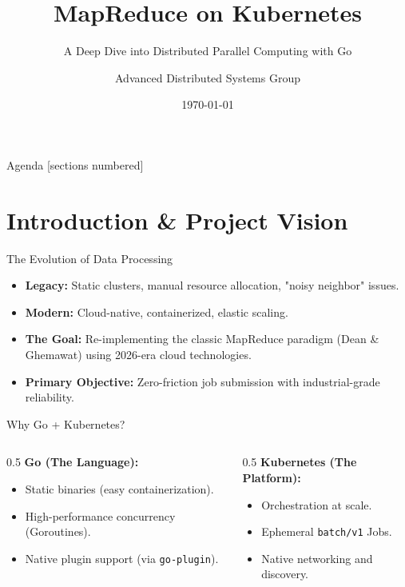 \documentclass[10pt,aspectratio=169]{beamer}
\title{MapReduce on Kubernetes}
\subtitle{A Deep Dive into Distributed Parallel Computing with Go}
\author{Advanced Distributed Systems Group}
\date{\today}
\begin{document}
\maketitle

\begin{frame}{Agenda}
    [sections numbered]
    \tableofcontents[hideallsubsections]
\end{frame}

\section{Introduction \& Project Vision}

\begin{frame}{The Evolution of Data Processing}
    \begin{itemize}
        \item \textbf{Legacy:} Static clusters, manual resource allocation, "noisy neighbor" issues.
        \item \textbf{Modern:} Cloud-native, containerized, elastic scaling.
        \item \textbf{The Goal:} Re-implementing the classic MapReduce paradigm (Dean \& Ghemawat) using 2026-era cloud technologies.
        \item \textbf{Primary Objective:} Zero-friction job submission with industrial-grade reliability.
    \end{itemize}
\end{frame}

\begin{frame}{Why Go + Kubernetes?}
    \begin{columns}
        \begin{column}{0.5\textwidth}
            \textbf{Go (The Language):}
            \begin{itemize}
                \item Static binaries (easy containerization).
                \item High-performance concurrency (Goroutines).
                \item Native plugin support (via \texttt{go-plugin}).
            \end{itemize}
        \end{column}
        \begin{column}{0.5\textwidth}
            \textbf{Kubernetes (The Platform):}
            \begin{itemize}
                \item Orchestration at scale.
                \item Ephemeral \texttt{batch/v1} Jobs.
                \item Native networking and discovery.
            \end{itemize}
        \end{column}
    \end{columns}
\end{frame}
\end{document}
